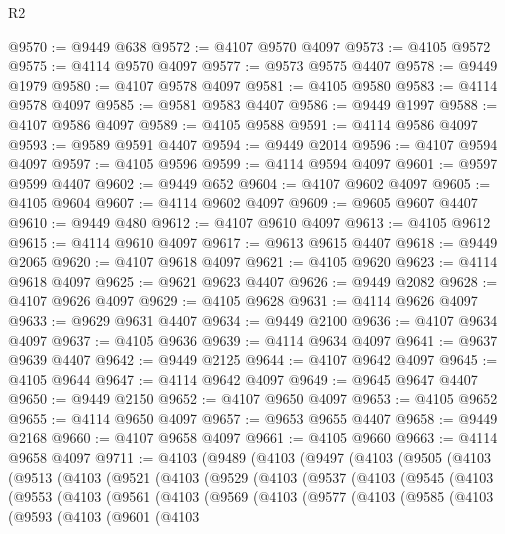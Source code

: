 \begin{lexlean}{R2}
\begin{coremodule}
@9570 := @9449 @638
@9572 := @4107 @9570 @4097
@9573 := @4105 @9572
@9575 := @4114 @9570 @4097
@9577 := @9573 @9575 @4407
@9578 := @9449 @1979
@9580 := @4107 @9578 @4097
@9581 := @4105 @9580
@9583 := @4114 @9578 @4097
@9585 := @9581 @9583 @4407
@9586 := @9449 @1997
@9588 := @4107 @9586 @4097
@9589 := @4105 @9588
@9591 := @4114 @9586 @4097
@9593 := @9589 @9591 @4407
@9594 := @9449 @2014
@9596 := @4107 @9594 @4097
@9597 := @4105 @9596
@9599 := @4114 @9594 @4097
@9601 := @9597 @9599 @4407
@9602 := @9449 @652
@9604 := @4107 @9602 @4097
@9605 := @4105 @9604
@9607 := @4114 @9602 @4097
@9609 := @9605 @9607 @4407
@9610 := @9449 @480
@9612 := @4107 @9610 @4097
@9613 := @4105 @9612
@9615 := @4114 @9610 @4097
@9617 := @9613 @9615 @4407
@9618 := @9449 @2065
@9620 := @4107 @9618 @4097
@9621 := @4105 @9620
@9623 := @4114 @9618 @4097
@9625 := @9621 @9623 @4407
@9626 := @9449 @2082
@9628 := @4107 @9626 @4097
@9629 := @4105 @9628
@9631 := @4114 @9626 @4097
@9633 := @9629 @9631 @4407
@9634 := @9449 @2100
@9636 := @4107 @9634 @4097
@9637 := @4105 @9636
@9639 := @4114 @9634 @4097
@9641 := @9637 @9639 @4407
@9642 := @9449 @2125
@9644 := @4107 @9642 @4097
@9645 := @4105 @9644
@9647 := @4114 @9642 @4097
@9649 := @9645 @9647 @4407
@9650 := @9449 @2150
@9652 := @4107 @9650 @4097
@9653 := @4105 @9652
@9655 := @4114 @9650 @4097
@9657 := @9653 @9655 @4407
@9658 := @9449 @2168
@9660 := @4107 @9658 @4097
@9661 := @4105 @9660
@9663 := @4114 @9658 @4097
@9711 := @4103
    (@9489
      (@4103
        (@9497
          (@4103
            (@9505
              (@4103
                (@9513
                  (@4103
                    (@9521
                      (@4103
                        (@9529
                          (@4103
                            (@9537
                              (@4103
                                (@9545
                                  (@4103
                                    (@9553
                                      (@4103
                                        (@9561
                                          (@4103
                                            (@9569
                                              (@4103
                                                (@9577
                                                  (@4103
                                                    (@9585
                                                      (@4103
                                                        (@9593
                                                          (@4103
                                                            (@9601
                                                              (@4103

\end{coremodule}
\end{lexlean}
